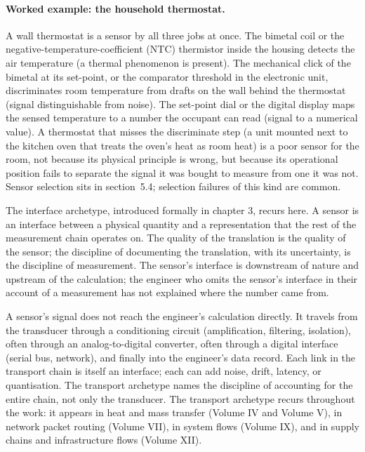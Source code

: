 \paragraph{Worked example: the household thermostat.} A wall
thermostat is a sensor by all three jobs at once. The bimetal coil
or the negative-temperature-coefficient (NTC) thermistor inside the
housing detects the air temperature (a thermal phenomenon is
present). The mechanical click of the bimetal at its set-point, or
the comparator threshold in the electronic unit, discriminates room
temperature from drafts on the wall behind the thermostat (signal
distinguishable from noise). The set-point dial or the digital
display maps the sensed temperature to a number the occupant can
read (signal to a numerical value). A thermostat that misses the
discriminate step (a unit mounted next to the kitchen oven that
treats the oven's heat as room heat) is a poor sensor for the room,
not because its physical principle is wrong, but because its
operational position fails to separate the signal it was bought to
measure from one it was not. Sensor selection sits in section~5.4;
selection failures of this kind are common.

\begin{archetype}
The interface archetype, introduced formally in chapter 3, recurs
here. A sensor is an interface between a physical quantity and a
representation that the rest of the measurement chain operates on.
The quality of the translation is the quality of the sensor; the
discipline of documenting the translation, with its uncertainty, is
the discipline of measurement. The sensor's interface is downstream
of nature and upstream of the calculation; the engineer who omits
the sensor's interface in their account of a measurement has not
explained where the number came from.
\end{archetype}

\begin{archetype}
A sensor's signal does not reach the engineer's calculation
directly. It travels from the transducer through a conditioning
circuit (amplification, filtering, isolation), often through an
analog-to-digital converter, often through a digital interface
(serial bus, network), and finally into the engineer's data record.
Each link in the transport chain is itself an interface; each can
add noise, drift, latency, or quantisation. The transport archetype
names the discipline of accounting for the entire chain, not only
the transducer. The transport archetype recurs throughout the work:
it appears in heat and mass transfer (Volume IV and Volume V), in
network packet routing (Volume VII), in system flows (Volume IX),
and in supply chains and infrastructure flows (Volume XII).
\end{archetype}

